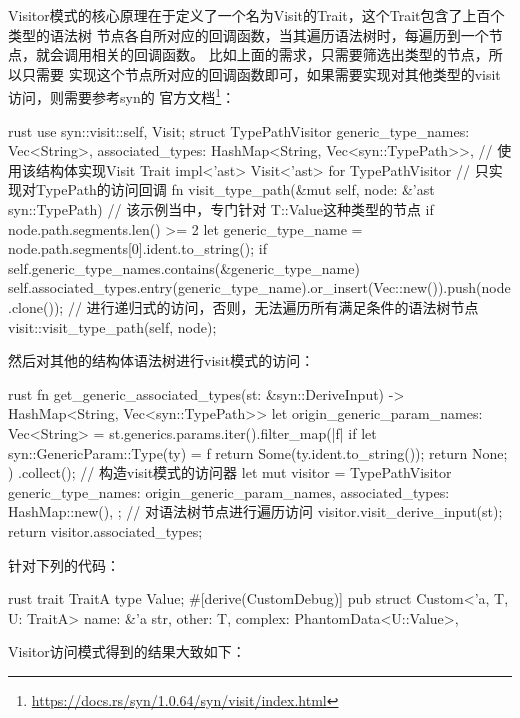 Visitor模式的核心原理在于定义了一个名为Visit的Trait，这个Trait包含了上百个类型的语法树
节点各自所对应的回调函数，当其遍历语法树时，每遍历到一个节点，就会调用相关的回调函数。
比如上面的需求，只需要筛选出类型的节点，所以只需要
实现这个节点所对应的回调函数即可，如果需要实现对其他类型的visit访问，则需要参考syn的
官方文档\footnote{\url{https://docs.rs/syn/1.0.64/syn/visit/index.html}}：
\begin{code-block}{rust}
use syn::visit::{self, Visit};
struct TypePathVisitor {
    generic_type_names: Vec<String>,
    associated_types: HashMap<String, Vec<syn::TypePath>>,
}
// 使用该结构体实现Visit Trait
impl<'ast> Visit<'ast> for TypePathVisitor {
    // 只实现对TypePath的访问回调
    fn visit_type_path(&mut self, node: &'ast syn::TypePath) {
        // 该示例当中，专门针对 T::Value这种类型的节点
        if node.path.segments.len() >= 2 {
            let generic_type_name = node.path.segments[0].ident.to_string();
            if self.generic_type_names.contains(&generic_type_name) {
                self.associated_types.entry(generic_type_name).or_insert(Vec::new()).push(node.clone());
            }
        }
        // 进行递归式的访问，否则，无法遍历所有满足条件的语法树节点
        visit::visit_type_path(self, node);
    }
}
\end{code-block}
然后对其他的结构体语法树进行visit模式的访问：
\begin{code-block}{rust}
fn get_generic_associated_types(st: &syn::DeriveInput) -> HashMap<String, Vec<syn::TypePath>> {
    let origin_generic_param_names: Vec<String> = st.generics.params.iter().filter_map(|f| {
            if let syn::GenericParam::Type(ty) = f {
                return Some(ty.ident.to_string());
            }
            return None;
        })
        .collect();
    // 构造visit模式的访问器
    let mut visitor = TypePathVisitor {
        generic_type_names: origin_generic_param_names,
        associated_types: HashMap::new(),
    };
    // 对语法树节点进行遍历访问
    visitor.visit_derive_input(st);
    return visitor.associated_types;
}
\end{code-block}
针对下列的代码：
\begin{code-block}{rust}
trait TraitA {
    type Value;
}
#[derive(CustomDebug)]
pub struct Custom<'a, T, U: TraitA> {
    name: &'a str,
    other: T,
    complex: PhantomData<U::Value>,
}
\end{code-block}
Visitor访问模式得到的结果大致如下：
